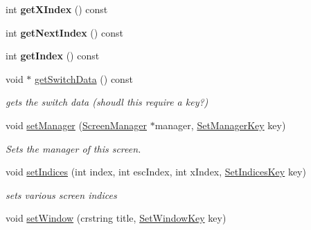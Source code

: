 \begin{DoxyCompactItemize}
\mbox{\label{classnta_1_1Screen_a01f4fdd4cadd6abe4fef2605a0fde52a}} 
int {\bfseries get\+X\+Index} () const
\item 
\mbox{\label{classnta_1_1Screen_aba9c09cd06dfc05557b86d866a7fb2b9}} 
int {\bfseries get\+Next\+Index} () const
\item 
\mbox{\label{classnta_1_1Screen_ae149bdd787f8f41b45c667faef971326}} 
int {\bfseries get\+Index} () const
\item 
\mbox{\label{classnta_1_1Screen_af1b73d1b96163a764f78714d5b61a44c}} 
void $\ast$ \hyperlink{classnta_1_1Screen_af1b73d1b96163a764f78714d5b61a44c}{get\+Switch\+Data} () const
\begin{DoxyCompactList}\small\item\em gets the switch data (shoudl this require a key?) \end{DoxyCompactList}\item 
\mbox{\label{classnta_1_1Screen_a9c9329a6700fbed8ab6513d471835bfa}} 
void \hyperlink{classnta_1_1Screen_a9c9329a6700fbed8ab6513d471835bfa}{set\+Manager} (\hyperlink{classnta_1_1ScreenManager}{Screen\+Manager} $\ast$manager, \hyperlink{classnta_1_1SetManagerKey}{Set\+Manager\+Key} key)
\begin{DoxyCompactList}\small\item\em Sets the manager of this screen. \end{DoxyCompactList}\item 
\mbox{\label{classnta_1_1Screen_afd02c1e6f40bb7262cc23e2d0583544b}} 
void \hyperlink{classnta_1_1Screen_afd02c1e6f40bb7262cc23e2d0583544b}{set\+Indices} (int index, int esc\+Index, int x\+Index, \hyperlink{classnta_1_1SetIndicesKey}{Set\+Indices\+Key} key)
\begin{DoxyCompactList}\small\item\em sets various screen indices \end{DoxyCompactList}\item 
\mbox{\label{classnta_1_1Screen_a427eb6b2e064c23a19e7b9076b8eb2c9}} 
void \hyperlink{classnta_1_1Screen_a427eb6b2e064c23a19e7b9076b8eb2c9}{set\+Window} (crstring title, \hyperlink{classnta_1_1SetWindowKey}{Set\+Window\+Key} key)

\end{DoxyCompactItemize}
